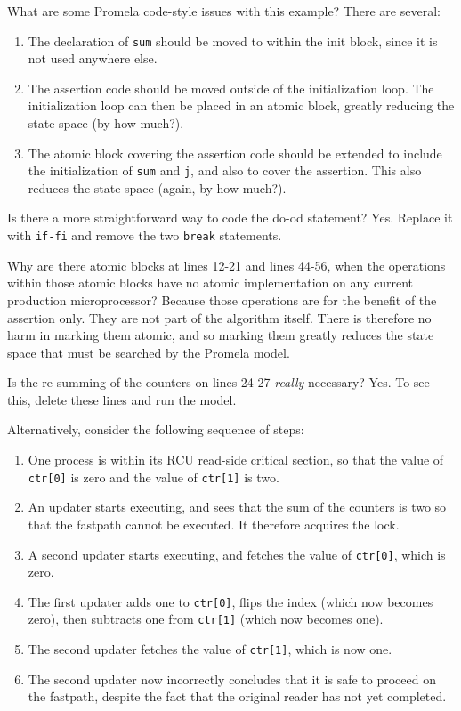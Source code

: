 \begin{enumerate}
\QuickQ{}
	What are some Promela code-style issues with this example?
\QuickA{}
	There are several:
	\begin{enumerate}
	\item	The declaration of {\tt sum} should be moved to within
		the init block, since it is not used anywhere else.
	\item	The assertion code should be moved outside of the
		initialization loop.  The initialization loop can
		then be placed in an atomic block, greatly reducing
		the state space (by how much?).
	\item	The atomic block covering the assertion code should
		be extended to include the initialization of {\tt sum}
		and {\tt j}, and also to cover the assertion.
		This also reduces the state space (again, by how
		much?).
	\end{enumerate}

\QuickQ{}
	Is there a more straightforward way to code the do-od statement?
\QuickA{}
	Yes.
	Replace it with {\tt if-fi} and remove the two {\tt break} statements.

\QuickQ{}
	Why are there atomic blocks at lines 12-21
	and lines 44-56, when the operations within those atomic
	blocks have no atomic implementation on any current
	production microprocessor?
\QuickA{}
	Because those operations are for the benefit of the
	assertion only.  They are not part of the algorithm itself.
	There is therefore no harm in marking them atomic, and
	so marking them greatly reduces the state space that must
	be searched by the Promela model.

\QuickQ{}
	Is the re-summing of the counters on lines 24-27
	\emph{really} necessary?
\QuickA{}
	Yes.  To see this, delete these lines and run the model.

	Alternatively, consider the following sequence of steps:

	\begin{enumerate}
	\item	One process is within its RCU read-side critical
		section, so that the value of {\tt ctr[0]} is zero and
		the value of {\tt ctr[1]} is two.
	\item	An updater starts executing, and sees that the sum of
		the counters is two so that the fastpath cannot be
		executed.  It therefore acquires the lock.
	\item	A second updater starts executing, and fetches the value
		of {\tt ctr[0]}, which is zero.
	\item	The first updater adds one to {\tt ctr[0]}, flips
		the index (which now becomes zero), then subtracts
		one from {\tt ctr[1]} (which now becomes one).
	\item	The second updater fetches the value of {\tt ctr[1]},
		which is now one.
	\item	The second updater now incorrectly concludes that it
		is safe to proceed on the fastpath, despite the fact
		that the original reader has not yet completed.
	\end{enumerate}


\end{enumerate}
